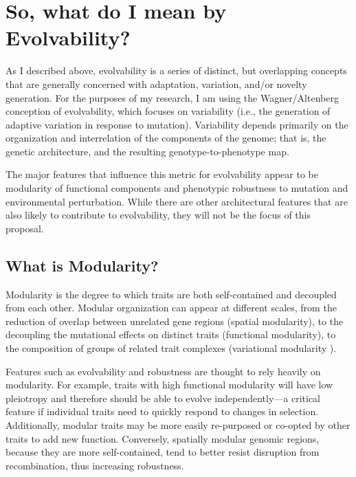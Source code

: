 \documentclass[PhD]{msu-thesis}
\begin{document}
\section{So, what do I mean by Evolvability?}
As I described above, evolvability is a series of distinct, but overlapping concepts that are generally concerned with adaptation, variation, and/or novelty generation. For the purposes of my research, I am using the Wagner/Altenberg conception of evolvability, which focuses on variability (i.e., the generation of adaptive variation in response to mutation). Variability depends primarily on the organization and interrelation of the components of the genome; that is, the genetic architecture, and the resulting genotype-to-phenotype map.

The major features that influence this metric for evolvability appear to be modularity of functional components and phenotypic robustness to mutation and environmental perturbation. While there are other architectural features that are also likely to contribute to evolvability, they will not be the focus of this proposal.



\subsection{What is Modularity?}
Modularity is the degree to which traits are both self-contained and decoupled from each other. Modular organization can appear at different scales, from the reduction of overlap between unrelated gene regions (spatial modularity\cite{misevic_sexual_2006}), to the decoupling the mutational effects on distinct traits (functional modularity\cite{gunter_p._wagner_perspective:_1996}), to the composition of groups of related trait complexes (variational modularity \cite{gunter_p._wagner_pleiotropic_2011,ravasz_hierarchical_2002}).

Features such as evolvability and robustness are thought to rely heavily on modularity\cite{gunter_p._wagner_perspective:_1996}. For example, traits with high functional modularity will have low pleiotropy and therefore should be able to evolve independently---a critical feature if individual traits need to quickly respond to changes in selection. Additionally, modular traits may be more easily re-purposed or co-opted by other traits to add new function\cite{ravasz_hierarchical_2002}.
Conversely, spatially modular genomic regions, because they are more self-contained, tend to better resist disruption from recombination, thus increasing robustness\cite{misevic_sexual_2006}. 
\end{document}
